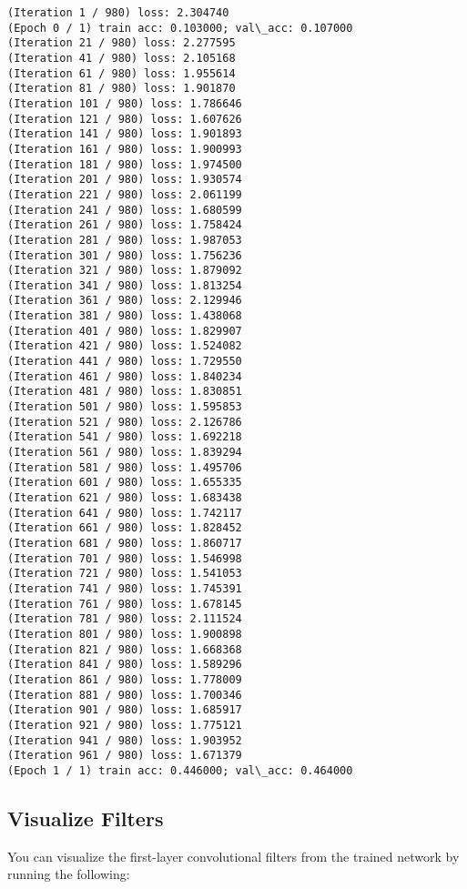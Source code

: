 \documentclass[11pt]{article}
\begin{document}
    \begin{Verbatim}[commandchars=\\\{\}]
(Iteration 1 / 980) loss: 2.304740
(Epoch 0 / 1) train acc: 0.103000; val\_acc: 0.107000
(Iteration 21 / 980) loss: 2.277595
(Iteration 41 / 980) loss: 2.105168
(Iteration 61 / 980) loss: 1.955614
(Iteration 81 / 980) loss: 1.901870
(Iteration 101 / 980) loss: 1.786646
(Iteration 121 / 980) loss: 1.607626
(Iteration 141 / 980) loss: 1.901893
(Iteration 161 / 980) loss: 1.900993
(Iteration 181 / 980) loss: 1.974500
(Iteration 201 / 980) loss: 1.930574
(Iteration 221 / 980) loss: 2.061199
(Iteration 241 / 980) loss: 1.680599
(Iteration 261 / 980) loss: 1.758424
(Iteration 281 / 980) loss: 1.987053
(Iteration 301 / 980) loss: 1.756236
(Iteration 321 / 980) loss: 1.879092
(Iteration 341 / 980) loss: 1.813254
(Iteration 361 / 980) loss: 2.129946
(Iteration 381 / 980) loss: 1.438068
(Iteration 401 / 980) loss: 1.829907
(Iteration 421 / 980) loss: 1.524082
(Iteration 441 / 980) loss: 1.729550
(Iteration 461 / 980) loss: 1.840234
(Iteration 481 / 980) loss: 1.830851
(Iteration 501 / 980) loss: 1.595853
(Iteration 521 / 980) loss: 2.126786
(Iteration 541 / 980) loss: 1.692218
(Iteration 561 / 980) loss: 1.839294
(Iteration 581 / 980) loss: 1.495706
(Iteration 601 / 980) loss: 1.655335
(Iteration 621 / 980) loss: 1.683438
(Iteration 641 / 980) loss: 1.742117
(Iteration 661 / 980) loss: 1.828452
(Iteration 681 / 980) loss: 1.860717
(Iteration 701 / 980) loss: 1.546998
(Iteration 721 / 980) loss: 1.541053
(Iteration 741 / 980) loss: 1.745391
(Iteration 761 / 980) loss: 1.678145
(Iteration 781 / 980) loss: 2.111524
(Iteration 801 / 980) loss: 1.900898
(Iteration 821 / 980) loss: 1.668368
(Iteration 841 / 980) loss: 1.589296
(Iteration 861 / 980) loss: 1.778009
(Iteration 881 / 980) loss: 1.700346
(Iteration 901 / 980) loss: 1.685917
(Iteration 921 / 980) loss: 1.775121
(Iteration 941 / 980) loss: 1.903952
(Iteration 961 / 980) loss: 1.671379
(Epoch 1 / 1) train acc: 0.446000; val\_acc: 0.464000

    \end{Verbatim}

    \subsection{Visualize Filters}\label{visualize-filters}

You can visualize the first-layer convolutional filters from the trained
network by running the following:
\end{document}
